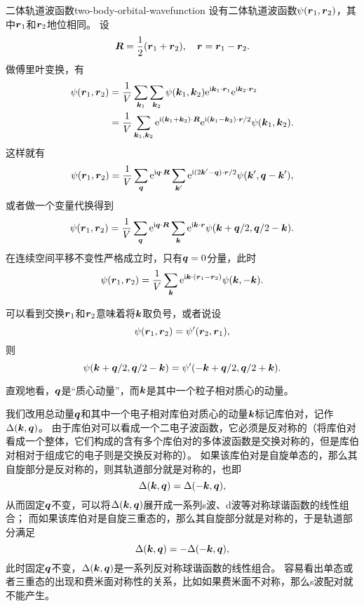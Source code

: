 \begin{back}{二体轨道波函数}{two-body-orbital-wavefunction}
    设有二体轨道波函数$\psi(\vb*{r}_1, \vb*{r}_2)$，其中$\vb*{r}_1$和$\vb*{r}_2$地位相同。
    设
    \begin{equation}
        \vb*{R} = \frac{1}{2} (\vb*{r}_1 + \vb*{r}_2), \quad \vb*{r} = \vb*{r}_1 - \vb*{r}_2.
    \end{equation}
    做傅里叶变换，有
    \[
        \begin{aligned}
            \psi(\vb*{r}_1, \vb*{r}_2) &= \frac{1}{V} \sum_{\vb*{k}_1} \sum_{\vb*{k}_2} \psi(\vb*{k}_1, \vb*{k}_2) \mathrm{e}^{\mathrm{i} \vb*{k}_1 \cdot \vb*{r}_1} \mathrm{e}^{\mathrm{i} \vb*{k}_2 \cdot \vb*{r}_2} \\
            &= \frac{1}{V} \sum_{\vb*{k}_1, \vb*{k}_2} \mathrm{e}^{\mathrm{i} (\vb*{k}_1 + \vb*{k}_2) \cdot \vb*{R}} \mathrm{e}^{\mathrm{i} (\vb*{k}_1 - \vb*{k}_2) \cdot \vb*{r} / 2} \psi(\vb*{k}_1, \vb*{k}_2).
        \end{aligned}
    \]
    这样就有
    \[
        \psi(\vb*{r}_1, \vb*{r}_2) = \frac{1}{V} \sum_{\vb*{q}} \mathrm{e}^{\mathrm{i} \vb*{q} \cdot \vb*{R} } \sum_{\vb*{k}'} \mathrm{e}^{\mathrm{i} (2 \vb*{k}' - \vb*{q}) \cdot \vb*{r} / 2} \psi(\vb*{k}', \vb*{q} - \vb*{k}'),
    \]
    或者做一个变量代换得到
    \begin{equation}
        \psi(\vb*{r}_1, \vb*{r}_2) = \frac{1}{V} \sum_{\vb*{q}} \mathrm{e}^{\mathrm{i} \vb*{q} \cdot \vb*{R} } \sum_{\vb*{k}} \mathrm{e}^{\mathrm{i} \vb*{k} \cdot \vb*{r}} \psi(\vb*{k} + \vb*{q} / 2, \vb*{q} / 2 - \vb*{k}).
    \end{equation}
    在连续空间平移不变性严格成立时，只有$\vb*{q}=0$分量，此时
    \begin{equation}
        \psi(\vb*{r}_1, \vb*{r}_2) = \frac{1}{V} \sum_{\vb*{k}} \mathrm{e}^{\mathrm{i} \vb*{k} \cdot (\vb*{r}_1 - \vb*{r}_2)} \psi(\vb*{k}, -\vb*{k}).
    \end{equation}
    
    可以看到交换$\vb*{r}_1$和$\vb*{r}_2$意味着将$\vb*{k}$取负号，或者说设
    \[
        \psi(\vb*{r}_1, \vb*{r}_2) = \psi'(\vb*{r}_2, \vb*{r}_1),
    \]
    则
    \[
        \psi(\vb*{k} + \vb*{q} / 2, \vb*{q} / 2 - \vb*{k}) = \psi'(- \vb*{k} + \vb*{q} / 2, \vb*{q} / 2 + \vb*{k}).
    \]

    直观地看，$\vb*{q}$是“质心动量”，而$\vb*{k}$是其中一个粒子相对质心的动量。
\end{back}

我们改用总动量$\vb*{q}$和其中一个电子相对库伯对质心的动量$\vb*{k}$标记库伯对，记作$\Delta(\vb*{k}, \vb*{q})$。
由于库伯对可以看成一个二电子波函数，它必须是反对称的（将库伯对看成一个整体，它们构成的含有多个库伯对的多体波函数是交换对称的，但是库伯对相对于组成它的电子则是交换反对称的）。
如果该库伯对是自旋单态的，那么其自旋部分是反对称的，则其轨道部分就是对称的，也即
\[
    \Delta(\vb*{k}, \vb*{q}) = \Delta(-\vb*{k}, \vb*{q}),
\]
从而固定$\vb*{q}$不变，可以将$\Delta(\vb*{k}, \vb*{q})$展开成一系列s波、d波等对称球谐函数的线性组合；
而如果该库伯对是自旋三重态的，那么其自旋部分就是对称的，于是轨道部分满足
\[
    \Delta(\vb*{k}, \vb*{q}) = -\Delta(-\vb*{k}, \vb*{q}),
\]
此时固定$\vb*{q}$不变，$\Delta(\vb*{k}, \vb*{q})$是一系列反对称球谐函数的线性组合。
容易看出单态或者三重态的出现和费米面对称性的关系，比如如果费米面不对称，那么s波配对就不能产生。

